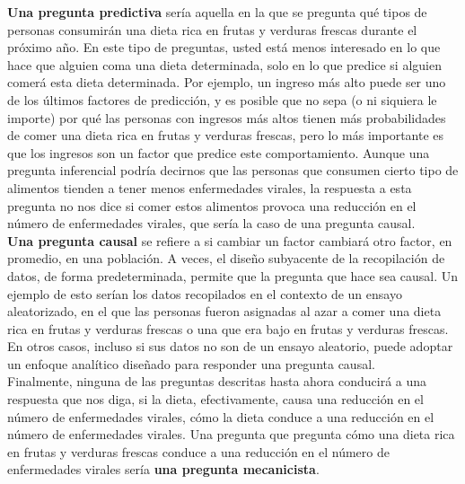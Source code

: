 \documentclass[10pt]{book}
\begin{document}
\textbf{Una pregunta predictiva} sería aquella en la que se pregunta qué tipos de personas consumirán una dieta rica en frutas y verduras frescas durante el próximo año. En este tipo de preguntas, usted está menos interesado en lo que hace que alguien coma una dieta determinada, solo en lo que predice si alguien comerá esta dieta determinada. Por ejemplo, un ingreso más alto puede ser uno de los últimos factores de predicción, y es posible que no sepa (o ni siquiera le importe) por qué las personas con ingresos más altos tienen más probabilidades de comer una dieta rica en frutas y verduras frescas, pero lo más importante es que los ingresos son un factor que predice este comportamiento. Aunque una pregunta inferencial podría decirnos que las personas que consumen cierto tipo de alimentos tienden a tener menos enfermedades virales, la respuesta a esta pregunta no nos dice si comer estos alimentos provoca una reducción en el número de enfermedades virales, que sería la caso de una pregunta causal.\\
\textbf{Una pregunta causal} se refiere a si cambiar un factor cambiará otro factor, en promedio, en una población. A veces, el diseño subyacente de la recopilación de datos, de forma predeterminada, permite que la pregunta que hace sea causal. Un ejemplo de esto serían los datos recopilados en el contexto de un ensayo aleatorizado, en el que las personas fueron asignadas al azar a comer una dieta rica en frutas y verduras frescas o una que era bajo en frutas y verduras frescas. En otros casos, incluso si sus datos no son de un ensayo aleatorio, puede adoptar un enfoque analítico diseñado para responder una pregunta causal.\\
Finalmente, ninguna de las preguntas descritas hasta ahora conducirá a una respuesta que nos diga, si la dieta, efectivamente, causa una reducción en el número de enfermedades virales, cómo la dieta conduce a una reducción en el número de enfermedades virales. Una pregunta que pregunta cómo una dieta rica en frutas y verduras frescas conduce a una reducción en el número de enfermedades virales sería \textbf{una pregunta mecanicista}.\\
\end{document}
